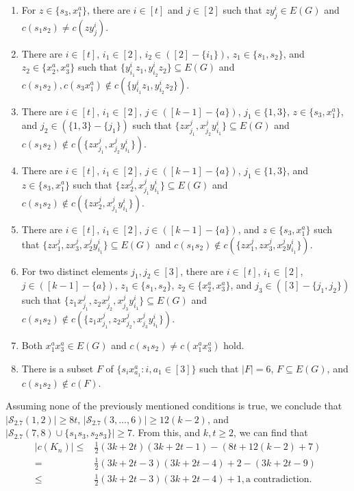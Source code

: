 \documentclass[12pt]{article}
\begin{document}
 \begin{enumerate}
    \item For $z\in\{s_3,x^a_1\}$, there are $i\in[t]$ and $j\in[2]$ such that $zy^i_j\in E(G)$ and $c(s_1s_2)\neq c(zy^i_j)$.
    \item There are $i\in[t]$, $i_1\in[2]$, $i_2\in([2]-\{i_1\})$, $z_1\in\{s_1,s_2\}$, and $z_2\in\{x^a_2,x^a_3\}$ such that $\{y^i_{i_1}z_1,y^i_{i_2}z_2\}\subseteq E(G)$ and $c(s_1s_2),c(s_3x^a_1)\not\in c(\{y^i_{i_1}z_1,y^i_{i_2}z_2\})$.
    \item There are $i\in[t]$, $i_1\in[2]$, $j\in([k-1]-\{a\})$, $j_1\in\{1,3\}$, $z\in\{s_3,x_1^a\}$, and $j_2\in(\{1,3\}-\{j_1\})$ such that $\{zx^j_{j_1},x^j_{j_2}y^i_{i_1}\}\subseteq E(G)$ and $c(s_1s_2)\not\in c(\{zx^j_{j_1},x^j_{j_2}y^i_{i_1}\})$.
    \item There are $i\in[t]$, $i_1\in[2]$, $j\in([k-1]-\{a\})$, $j_1\in\{1,3\}$, and $z\in\{s_3,x_1^a\}$ such that $\{zx^j_{2},x^j_{j_1}y^i_{i_1}\}\subseteq E(G)$ and $c(s_1s_2)\not\in c(\{zx^j_{2},x^j_{j_1}y^i_{i_1}\})$.
     \item There are $i\in[t]$, $i_1\in[2]$, $j\in([k-1]-\{a\})$, and $z\in\{s_3,x_1^a\}$ such that $\{zx^j_{1},zx^j_3,x^j_{2}y^i_{i_1}\}\subseteq E(G)$ and $c(s_1s_2)\not\in c(\{zx^j_{1},zx^j_3,x^j_{2}y^i_{i_1}\})$.
      \item For two distinct elements $j_1,j_2\in[3]$, there are $i\in[t]$, $i_1\in[2]$, \( j \in ([k-1] - \{a\}) \),  $z_1\in\{s_1,s_2\}$, $z_2\in\{x^a_2,x^a_3\}$, and $j_3\in([3]-\{j_1,j_2\})$ such that $\{z_1x^j_{j_1},z_2x^j_{j_2}, x^j_{j_3}y^i_{i_1}\}\subseteq E(G)$ and $c(s_1s_2)\not\in c(\{z_1x^j_{j_1},z_2x^j_{j_2}, x^j_{j_3}y^i_{i_1}\})$.
      \item Both $ x_1^ax_3^a\in E(G)$ and $c(s_1s_2)\neq c(x_1^ax_3^a)$ hold. 
       \item There is a subset $F$ of $\{s_ix^a_{a_1}:i,a_1\in[3]\}$ such that $|F|=6$, $F\subseteq E(G)$, and $c(s_1s_2)\not\in c(F)$.
 \end{enumerate}
Assuming none of the previously mentioned conditions is true, we conclude that \( |\mathcal{S}_{2.7}(1,2)| \geq 8t \), \( |\mathcal{S}_{2.7}(3,\ldots,6)| \geq 12(k-2) \), and \( |\mathcal{S}_{2.7}(7,8) \cup \{s_1s_3,s_2s_3\}| \geq 7 \). From this, and $k,t\geq2$, we can find that 
\begin{align*}
  |c(K_n)|\leq & \frac{1}{2}(3k+2t)(3k+2t-1)-(8t+12(k-2)+7)\\
  =& \frac{1}{2}(3k+2t-3)(3k+2t-4)+2-(3k+2t-9)\\
  \leq &\frac{1}{2}(3k+2t-3)(3k+2t-4)+1, \text{a contradiction}.
\end{align*}
\end{document}
